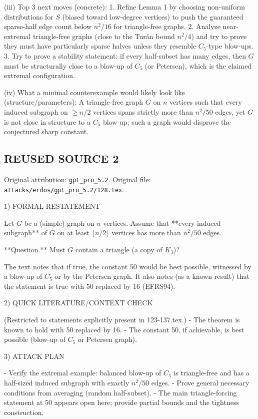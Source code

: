(iii) Top 3 next moves (concrete):
1. Refine Lemma 1 by choosing non-uniform distributions for $S$ (biased toward low-degree vertices) to push the guaranteed sparse-half edge count below $n^2/16$ for triangle-free graphs.
2. Analyze near-extremal triangle-free graphs (close to the Tur\'an bound $n^2/4$) and try to prove they must have particularly sparse halves unless they resemble $C_5$-type blow-ups.
3. Try to prove a stability statement: if every half-subset has many edges, then $G$ must be structurally close to a blow-up of $C_5$ (or Petersen), which is the claimed extremal configuration.

(iv) What a minimal counterexample would likely look like (structure/parameters):
A triangle-free graph $G$ on $n$ vertices such that every induced subgraph on $\ge n/2$ vertices spans strictly more than $n^2/50$ edges,
yet $G$ is not close in structure to a $C_5$ blow-up; such a graph would disprove the conjectured sharp constant.



\subsection*{REUSED SOURCE 2}
Original attribution: \texttt{gpt\_pro\_5.2}.
Original file: \texttt{attacks/erdos/gpt\_pro\_5.2/128.tex}.


1) FORMAL RESTATEMENT

Let $G$ be a (simple) graph on $n$ vertices.
Assume that **every induced subgraph** of $G$ on at least $\lfloor n/2\rfloor$ vertices has more than $n^2/50$ edges.

**Question.** Must $G$ contain a triangle (a copy of $K_3$)?

The text notes that if true, the constant 50 would be best possible, witnessed by a blow-up of $C_5$ or by the Petersen graph.
It also notes (as a known result) that the statement is true with 50 replaced by 16 (EFRS94).

2) QUICK LITERATURE/CONTEXT CHECK

(Restricted to statements explicitly present in 123-137.tex.)
- The theorem is known to hold with 50 replaced by 16.
- The constant 50, if achievable, is best possible (blow-up of $C_5$ or Petersen graph).

3) ATTACK PLAN

- Verify the extremal example: balanced blow-up of $C_5$ is triangle-free and has a half-sized induced subgraph with exactly $n^2/50$ edges.
- Prove general necessary conditions from averaging (random half-subset).
- The main triangle-forcing statement at 50 appears open here; provide partial bounds and the tightness construction.

